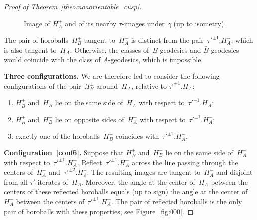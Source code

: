 \documentclass[11pt,reqno]{amsart}
\theoremstyle{definition}
\numberwithin{equation}{section}
\numberwithin{equation}{section}
\begin{document}
\begin{proof}[Proof of Theorem~\ref{theo:nonorientable_cusp}]
\begin{figure}[htbp!]
\centering
\vspace*{-0.5cm}
\hspace*{-0.5cm}
\def\svgwidth{0.75\textheight}

\vspace*{0,2cm}
\caption{Image of $H_A^+$ and of its nearby $\tau$-images under~$\gamma$ (up to isometry).} \label{fig:333}
\end{figure}


The pair of horoballs~$H_B^\pm$ tangent to~$H_A^-$ is distinct from the pair~$\tau'^{\pm 1}.H_A^-$, which is also tangent to~$H_A^-$.
Otherwise, the classes of~$B$-geodesics and $\bar{B}$-geodesics would coincide with the class of $A$-geodesics, which is impossible. 

\medskip

{\bf Three configurations.}
We are therefore led to consider the following configurations of the pair~$H_B^\pm$ around~$H_A^-$, relative to $\tau'^{\pm1}.H_A^-$:
\begin{enumerate}
\item $H_B^+$ and~$H_B^-$ lie on the same side of~$H_A^-$ with respect to~$\tau'^{\pm 1}.H_A^-$; \label{conf6} 
\item $H_B^+$ and~$H_B^-$ lie on opposite sides of~$H_A^-$ with respect to~$\tau'^{\pm 1}.H_A^-$; \label{conf5}
\item exactly one of the horoballs~$H_B^{\pm}$ coincides with~$\tau'^{\pm 1}.H_A^-$.  \label{conf1} \\
\end{enumerate}


\textbf{Configuration~\eqref{conf6}.}
Suppose that $H_B^+$ and~$H_B^-$ lie on the same side of~$H_A^-$ with respect to~$\tau'^{\pm 1}.H_A^-$.
Reflect~$\tau'^{\pm 1}.H_A^-$ across the line passing through the centers of~$H_A^-$ and~$\tau'^{\pm 2}.H_A^-$.
The resulting images are tangent to~$H_A^-$ and disjoint from all $\tau'$-iterates of~$H_A^-$.
Moreover, the angle at the center of~$H_A^-$ between the centers of these reflected horoballs equals (up to sign) the angle at the center of~$H_A^-$ between the centers of~$\tau'^{\pm 1}.H_A^-$.
The pair of reflected horoballs is the only pair of horoballs with these properties; see Figure~\ref{fig:000}.


\end{proof}
\end{document}
